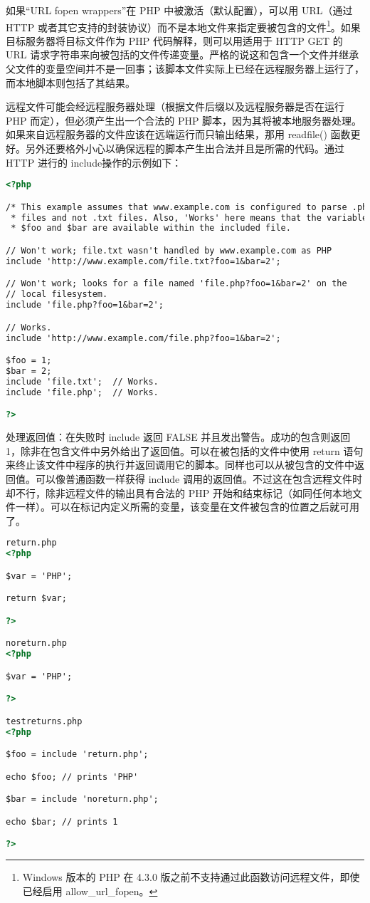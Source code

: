 如果“URL fopen wrappers”在 PHP 中被激活（默认配置），可以用 URL（通过 HTTP 或者其它支持的封装协议）而不是本地文件来指定要被包含的文件\footnote{Windows 版本的 PHP 在 4.3.0 版之前不支持通过此函数访问远程文件，即使已经启用 allow\_url\_fopen。}。如果目标服务器将目标文件作为 PHP 代码解释，则可以用适用于 HTTP GET 的 URL 请求字符串来向被包括的文件传递变量。严格的说这和包含一个文件并继承父文件的变量空间并不是一回事；该脚本文件实际上已经在远程服务器上运行了，而本地脚本则包括了其结果。

远程文件可能会经远程服务器处理（根据文件后缀以及远程服务器是否在运行 PHP 而定），但必须产生出一个合法的 PHP 脚本，因为其将被本地服务器处理。如果来自远程服务器的文件应该在远端运行而只输出结果，那用 readfile() 函数更好。另外还要格外小心以确保远程的脚本产生出合法并且是所需的代码。通过 HTTP 进行的 include操作的示例如下：


\begin{lstlisting}[language=HTML]
<?php

/* This example assumes that www.example.com is configured to parse .php *
 * files and not .txt files. Also, 'Works' here means that the variables *
 * $foo and $bar are available within the included file.                 */

// Won't work; file.txt wasn't handled by www.example.com as PHP
include 'http://www.example.com/file.txt?foo=1&bar=2';

// Won't work; looks for a file named 'file.php?foo=1&bar=2' on the
// local filesystem.
include 'file.php?foo=1&bar=2';

// Works.
include 'http://www.example.com/file.php?foo=1&bar=2';

$foo = 1;
$bar = 2;
include 'file.txt';  // Works.
include 'file.php';  // Works.

?>
\end{lstlisting}

处理返回值：在失败时 include 返回 FALSE 并且发出警告。成功的包含则返回 1，除非在包含文件中另外给出了返回值。可以在被包括的文件中使用 return 语句来终止该文件中程序的执行并返回调用它的脚本。同样也可以从被包含的文件中返回值。可以像普通函数一样获得 include 调用的返回值。不过这在包含远程文件时却不行，除非远程文件的输出具有合法的 PHP 开始和结束标记（如同任何本地文件一样）。可以在标记内定义所需的变量，该变量在文件被包含的位置之后就可用了。


\begin{lstlisting}[language=HTML]
return.php
<?php

$var = 'PHP';

return $var;

?>

noreturn.php
<?php

$var = 'PHP';

?>

testreturns.php
<?php

$foo = include 'return.php';

echo $foo; // prints 'PHP'

$bar = include 'noreturn.php';

echo $bar; // prints 1

?>
\end{lstlisting}


